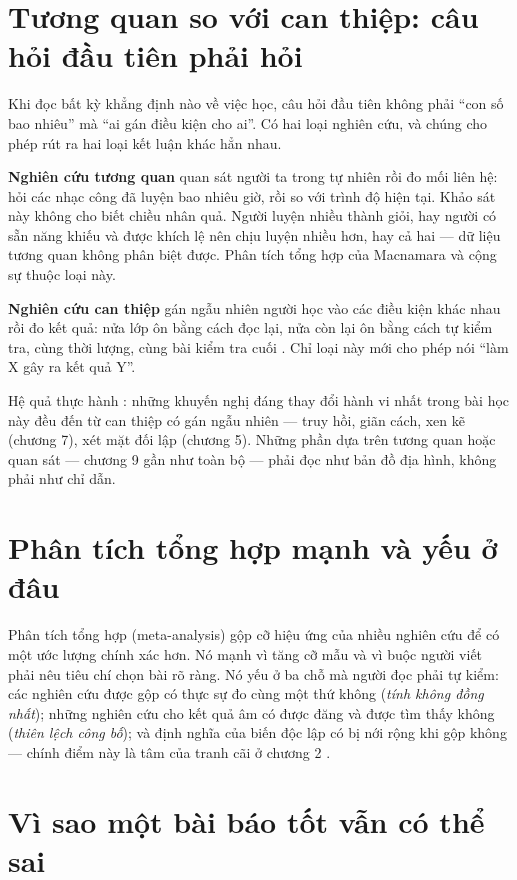 \documentclass[../hieu-suat.tex]{subfiles}
\begin{document}
\section{Tương quan so với can thiệp: câu hỏi đầu tiên phải hỏi}

Khi đọc bất kỳ khẳng định nào về việc học, câu hỏi đầu tiên không phải ``con số bao nhiêu'' mà ``ai gán điều kiện cho ai''. Có hai loại nghiên cứu, và chúng cho phép rút ra hai loại kết luận khác hẳn nhau.

\textbf{Nghiên cứu tương quan} quan sát người ta trong tự nhiên rồi đo mối liên hệ: hỏi các nhạc công đã luyện bao nhiêu giờ, rồi so với trình độ hiện tại. Khảo sát này không cho biết chiều nhân quả. Người luyện nhiều thành giỏi, hay người có sẵn năng khiếu và được khích lệ nên chịu luyện nhiều hơn, hay cả hai --- dữ liệu tương quan không phân biệt được. Phân tích tổng hợp của Macnamara và cộng sự \cite{macnamara2014} thuộc loại này.

\textbf{Nghiên cứu can thiệp} gán ngẫu nhiên người học vào các điều kiện khác nhau rồi đo kết quả: nửa lớp ôn bằng cách đọc lại, nửa còn lại ôn bằng cách tự kiểm tra, cùng thời lượng, cùng bài kiểm tra cuối \cite{roediger2006,karpicke2008}. Chỉ loại này mới cho phép nói ``làm X gây ra kết quả Y''.

Hệ quả thực hành \nM{}: những khuyến nghị đáng thay đổi hành vi nhất trong bài học này đều đến từ can thiệp có gán ngẫu nhiên --- truy hồi, giãn cách, xen kẽ (chương 7), xét mặt đối lập (chương 5). Những phần dựa trên tương quan hoặc quan sát --- chương 9 gần như toàn bộ --- phải đọc như bản đồ địa hình, không phải như chỉ dẫn.

\section{Phân tích tổng hợp mạnh và yếu ở đâu}

Phân tích tổng hợp (meta-analysis) gộp cỡ hiệu ứng của nhiều nghiên cứu để có một ước lượng chính xác hơn. Nó mạnh vì tăng cỡ mẫu và vì buộc người viết phải nêu tiêu chí chọn bài rõ ràng. Nó yếu ở ba chỗ mà người đọc phải tự kiểm: các nghiên cứu được gộp có thực sự đo cùng một thứ không (\emph{tính không đồng nhất}); những nghiên cứu cho kết quả âm có được đăng và được tìm thấy không (\emph{thiên lệch công bố}); và định nghĩa của biến độc lập có bị nới rộng khi gộp không --- chính điểm này là tâm của tranh cãi ở chương 2 \cite{macnamara2014,ericsson2021}.

\section{Vì sao một bài báo tốt vẫn có thể sai}
\end{document}
